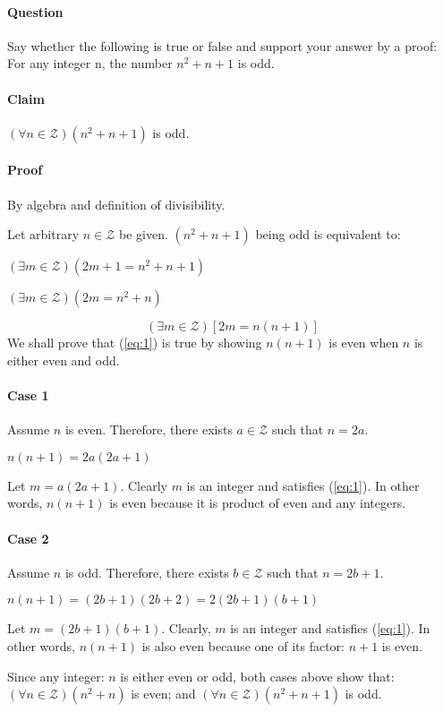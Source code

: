 \documentclass[14pt]{extarticle}
\begin{document}
	\paragraph{Question}
	Say whether the following is true or false and support your answer by a proof: For any integer n, the number $n^2+n+1$ is odd.
	\paragraph{Claim}
	$(\forall n \in \mathcal{Z}) (n^2+n+1)$ is odd.
	\paragraph{Proof} By algebra and definition of divisibility.
	\par\bigskip
	Let arbitrary $n \in \mathcal{Z}$ be given. $(n^2+n+1)$ being odd is equivalent to: 
	\begin{center}
	$(\exists m \in \mathcal{Z}) (2m+1 = n^2+n+1)$
	\par\bigskip
	$(\exists m \in \mathcal{Z}) (2m = n^2+n)$
	\end{center}
	\begin{equation}\label{eq:1}
	(\exists m \in \mathcal{Z}) [2m = n(n+1)]
	\end{equation}
	We shall prove that (\ref{eq:1}) is true by showing $n(n+1)$ is even when $n$ is either even and odd.  
	\paragraph{Case 1}
	Assume $n$ is even.  Therefore, there exists $a \in \mathcal{Z}$ such that $n = 2a$.
	\begin{center}
	$n(n+1) = 2a(2a+1)$
	\end{center}
	Let $m=a(2a+1)$.  Clearly $m$ is an integer and satisfies (\ref{eq:1}).  In other words, $n(n+1)$ is even because it is product of even and any integers.
	\paragraph{Case 2}
	Assume $n$ is odd.  Therefore, there exists $b \in \mathcal{Z}$ such that $n = 2b+1$.
	\begin{center}
	$n(n+1) = (2b+1)(2b+2) = 2(2b+1)(b+1)$		
	\end{center}
	Let $m=(2b+1)(b+1)$.  Clearly, $m$ is an integer and satisfies (\ref{eq:1}).  In other words, $n(n+1)$ is also even because one of its factor: $n+1$ is even.
	\par\bigskip
	Since any integer: $n$ is either even or odd, both cases above show that: $(\forall n \in \mathcal{Z}) (n^2+n)$ is even; and $(\forall n \in \mathcal{Z}) (n^2+n+1)$ is odd.
	
\end{document}
